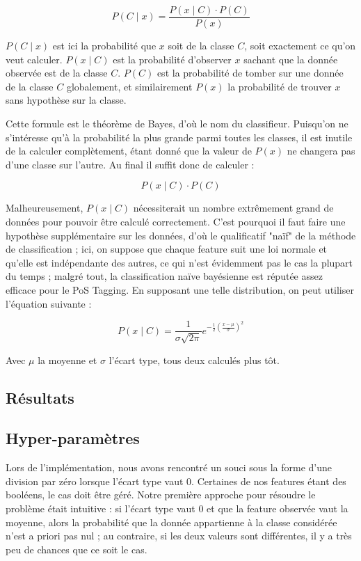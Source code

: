 \documentclass[french, 14pt]{memoir}
\begin{document}
\begin{equation}
P(C \mid x) = \frac{P(x \mid C) \cdot P(C)}{P(x)}
\end{equation}

$P(C \mid x)$ est ici la probabilité que $x$ soit de la classe $C$, soit exactement ce qu'on veut calculer. $P(x \mid C)$ est la probabilité d'observer $x$ sachant que la donnée observée est de la classe $C$. $P(C)$ est la probabilité de tomber sur une donnée de la classe $C$ globalement, et similairement $P(x)$ la probabilité de trouver $x$ sans hypothèse sur la classe.

Cette formule est le théorème de Bayes, d'où le nom du classifieur. Puisqu'on ne s'intéresse qu'à la probabilité la plus grande parmi toutes les classes, il est inutile de la calculer complètement, étant donné que la valeur de $P(x)$ ne changera pas d'une classe sur l'autre. Au final il suffit donc de calculer :

\begin{equation}
P(x \mid C) \cdot P(C)
\end{equation}

Malheureusement, $P(x \mid C)$ nécessiterait un nombre extrêmement grand de données pour pouvoir être calculé correctement. C'est pourquoi il faut faire une hypothèse supplémentaire sur les données, d'où le qualificatif "naïf" de la méthode de classification ; ici, on suppose que chaque feature suit une loi normale et qu'elle est indépendante des autres, ce qui n'est évidemment pas le cas la plupart du temps ; malgré tout, la classification naïve bayésienne est réputée assez efficace pour le PoS Tagging. En supposant une telle distribution, on peut utiliser l'équation suivante :

\begin{equation}
P(x \mid C) = \frac{1}{\sigma \sqrt{2 \pi}} e^{-\frac {1} {2} (\frac {x - \mu} {\sigma})^2}
\end{equation}

Avec $\mu$ la moyenne et $\sigma$ l'écart type, tous deux calculés plus tôt.


\subsection{Résultats}


\subsection{Hyper-paramètres}
Lors de l'implémentation, nous avons rencontré un souci sous la forme d'une division par zéro lorsque l'écart type vaut 0. Certaines de nos features étant des booléens, le cas doit être géré. Notre première approche pour résoudre le problème était intuitive : si l'écart type vaut 0 et que la feature observée vaut la moyenne, alors la probabilité que la donnée appartienne à la classe considérée n'est a priori pas nul ; au contraire, si les deux valeurs sont différentes, il y a très peu de chances que ce soit le cas.
\end{document}
